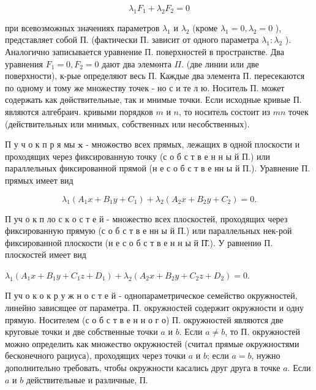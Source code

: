 \documentclass[10pt]{article}
\begin{document}
\[

\lambda_{1} F_{1}+\lambda_{2} F_{2}=0

\]



при всевозможных значениях параметров $\lambda_{1}$ и $\lambda_{2}$ (кроме $\lambda_{1}=0, \lambda_{2}=0$ ), представляет собой П. (фактически П. зависит от одного параметра $\lambda_{1}: \lambda_{2}$ ). Аналогично записывается уравнение П. поверхностей в пространстве. Два уравнения $F_{1}=0, F_{2}=0$ дают два элемөнта $\Pi$. (две линии или две поверхности), к-рые определяют весь П. Каждые два элемента П. пересекаются по одному и тому же множеству точек - но с и те л ю. Носитель П. может содержать как дөйствительные, так и мнимые точки. Если исходные кривые П. являются алгебраич. кривыми порядков $m$ и $n$, то носитель состоит из $m n$ точек (действительных или мнимых, собственных или несобственных).



П у ч о к п р я мы $\mathbf{x}$ - множөство всех прямых, лежащих в одной плоскости и проходящих через фиксированную точку (с о б с т в е н н ы й П.) или параллельных фиксированной прямой (н е с о б с т в е нн ы й П.). Уравнение П. прямых имеет вид



\[

\lambda_{1}\left(A_{1} x+B_{1} y+C_{1}\right)+\lambda_{2}\left(A_{2} x+B_{2} y+C_{2}\right)=0 .

\]



П уч о к п ло с к о с т е й - множество всех плоскостей, проходящих через фиксированную прямую (с о б с т в е нн ы й П.) или параллельных нек-рой фиксированной плоскости (н е с о б с т в е н н ы й П̆.). У равнениө П. плоскостей имеет вид



$\lambda_{1}\left(A_{1} x+B_{1} y+C_{1} z+D_{1}\right)+\lambda_{2}\left(A_{2} x+B_{2} y+C_{2} z+D_{2}\right)=0$.



П уч о к о к р у ж н о с т е й - однопараметрическое семейство окружностей, линейно зависящее от параметра. П. окружностей содержит окружности и одну прямую. Носителем (с о б с т в е н н о г о) П. окружностей являются две круговые точки и две собственные точки $a$ и $b$. Если $a \neq b$, то П. окружностей можно определить как множество окружностей (считал прямые окружностями бесконечного рациуса), проходящих через точки $a$ и $b$; если $a=b$, нужно дополнительно требовать, чтобы окружности касались друг друга в точке $a$. Если $a$ и $b$ действительные и различные, П.
\end{document}
